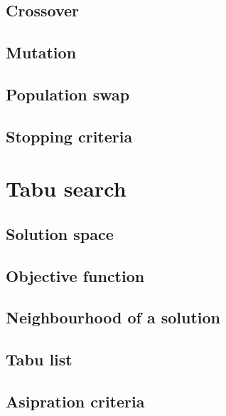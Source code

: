 \documentclass{article} %
\begin{document}
\subsection{Crossover}



\subsection{Mutation}



\subsection{Population swap}



\subsection{Stopping criteria}



\section{Tabu search}
\label{tabu_search}

\subsection{Solution space}



\subsection{Objective function}



\subsection{Neighbourhood of a solution}



\subsection{Tabu list}



\subsection{Asipration criteria}
\end{document}
